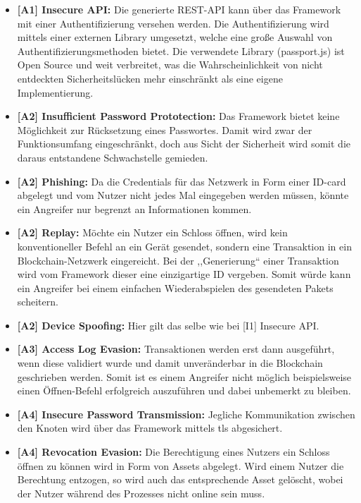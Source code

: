     \begin{itemize}[leftmargin=0cm,label={}]
        \item \textbf{[A1] Insecure API:} Die generierte REST-API kann über das Framework mit einer Authentifizierung versehen werden. 
        Die Authentifizierung wird mittels einer externen Library umgesetzt, welche eine große Auswahl von Authentifizierungsmethoden bietet. 
        Die verwendete Library (passport.js) ist Open Source und weit verbreitet, was die Wahrscheinlichkeit von nicht entdeckten Sicherheitslücken mehr einschränkt als eine eigene Implementierung. 
        \item \textbf{[A2] Insufficient Password Prototection:} Das Framework bietet keine Möglichkeit zur Rücksetzung eines Passwortes. 
        Damit wird zwar der Funktionsumfang eingeschränkt, doch aus Sicht der Sicherheit wird somit die daraus entstandene Schwachstelle gemieden.
        \item \textbf{[A2] Phishing:} Da die Credentials für das Netzwerk in Form einer ID-card abgelegt und vom Nutzer nicht jedes Mal eingegeben werden müssen, könnte ein Angreifer nur begrenzt an Informationen kommen.
        \item \textbf{[A2] Replay:} Möchte ein Nutzer ein Schloss öffnen, wird kein konventioneller Befehl an ein Gerät gesendet, sondern eine Transaktion in ein Blockchain-Netzwerk eingereicht. 
        Bei der ,,Generierung`` einer Transaktion wird vom Framework dieser eine einzigartige ID vergeben. 
        Somit würde kann ein Angreifer bei einem einfachen Wiederabspielen des gesendeten Pakets scheitern. 
        \item \textbf{[A2] Device Spoofing:} Hier gilt das selbe wie bei [I1] Insecure API. 
        \item \textbf{[A3] Access Log Evasion:} Transaktionen werden erst dann ausgeführt, wenn diese validiert wurde und damit unveränderbar in die Blockchain geschrieben werden. 
        Somit ist es einem Angreifer nicht möglich beispielsweise einen Öffnen-Befehl erfolgreich auszuführen und dabei unbemerkt zu bleiben.
        \item \textbf{[A4] Insecure Password Transmission:} Jegliche Kommunikation zwischen den Knoten wird über das Framework mittels \gls{tls} abgesichert.
        \item \textbf{[A4] Revocation Evasion:} Die Berechtigung eines Nutzers ein Schloss öffnen zu können wird in Form von Assets abgelegt. 
        Wird einem Nutzer die Berechtung entzogen, so wird auch das entsprechende Asset gelöscht, wobei der Nutzer während des Prozesses nicht online sein muss. 

\end{itemize}

